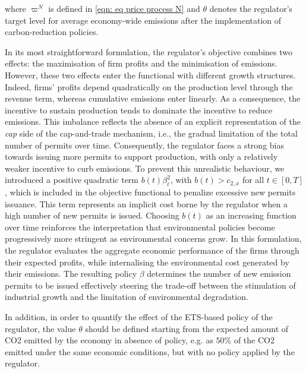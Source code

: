 \documentclass[10pt,a4paper]{amsart}
\numberwithin{equation}{section}
\newcommand{\w}{\varpi}
\begin{document}
where $\w^N$ is defined in \eqref{eqn: eq price process N} and $\theta$ denotes the regulator’s target level for average economy-wide emissions after the implementation of carbon-reduction policies.

In its most straightforward formulation, the regulator’s objective combines two effects: the maximisation of firm profits and the minimisation of emissions. However, these two effects enter the functional with different growth structures. Indeed, firms’ profits depend quadratically on the production level through the revenue term, whereas cumulative emissions enter linearly. As a consequence, the incentive to sustain production tends to dominate the incentive to reduce emissions. This imbalance reflects the absence of an explicit representation of the \emph{cap} side of the cap-and-trade mechanism, i.e., the gradual limitation of the total number of permits over time. Consequently, the regulator faces a strong bias towards issuing more permits to support production, with only a relatively weaker incentive to curb emissions.
To prevent this unrealistic behaviour, we introduced a positive quadratic term $b(t)\beta_t^2$, with  $b(t) > c_{2,x}$ for all $t\in[0,T]$, which is included in the objective functional to penalize excessive new permits issuance. This term represents an implicit cost borne by the regulator when a high number of new permits is issued. Choosing $b(t)$ as an increasing function over time reinforces the interpretation that environmental policies become progressively more stringent as environmental concerns grow. In this formulation, the regulator evaluates the aggregate economic performance of the firms through their expected profits, while internalising the environmental cost generated by their emissions. The resulting policy $\beta$ determines the number of new emission permits to be issued effectively steering the trade-off between the stimulation of industrial growth and the limitation of environmental degradation.

In addition, in order to quantify the effect of the ETS-based policy of the regulator, the value $\theta$ should be defined starting from the expected amount of CO2 emitted by the economy in absence of policy, e.g. as $50\%$ of the CO2 emitted under the same economic conditions, but with no policy applied by the regulator.
\end{document}
